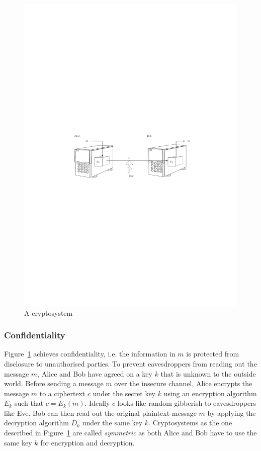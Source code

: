\begin{figure}
 \includegraphics[trim=40mm 120mm 40mm 120mm, clip]{img/cryptosystem.pdf}
 \caption{A cryptosystem~\cite{thesis:Wyseur09}}
 \label{fig:cryptosystem}
\end{figure}

\subsubsection{Confidentiality}
Figure~\ref{fig:cryptosystem} achieves confidentiality, i.e. the information in $m$ is protected from disclosure to unauthorised parties. To prevent eavesdroppers from reading out the message $m$, Alice and Bob have agreed on a key $k$ that is unknown to the outside world. Before sending a message $m$ over the insecure channel, Alice encrypts the message $m$ to a ciphertext $c$ under the secret key $k$ using an encryption algorithm $E_k$ such that $c = E_k \left( m \right)$. Ideally $c$ looks like random gibberish to eavesdroppers like Eve. Bob can then read out the original plaintext message $m$ by applying the decryption algorithm $D_k$ under the same key $k$. Cryptosystems as the one described in Figure~\ref{fig:cryptosystem} are called \textit{symmetric} as both Alice and Bob have to use the same key $k$ for encryption and decryption. 

